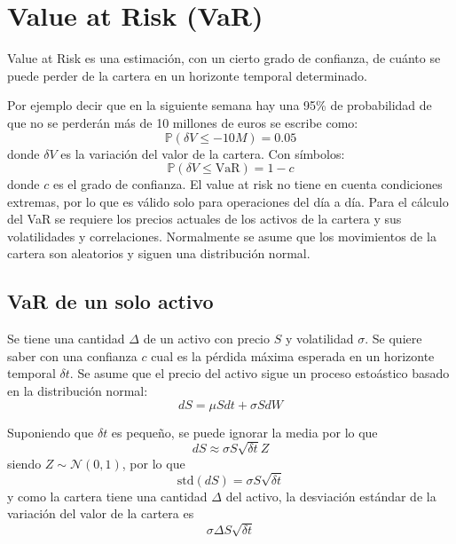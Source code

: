 \section{Value at Risk (VaR)}
Value at Risk es una estimación, con un cierto grado de confianza, de cuánto se puede perder de la cartera en un horizonte temporal determinado.

Por ejemplo decir que en la siguiente semana hay una 95\% de probabilidad de que no se perderán más de 10 millones de euros se escribe como:
\[
    \mathbb{P} \left( \delta V \leq -10M \right) = 0.05
\]
donde $\delta V$ es la variación del valor de la cartera. Con símbolos:
\[
    \mathbb{P} \left( \delta V \leq \text{VaR} \right) = 1 - c
\]
donde $c$ es el grado de confianza. El value at risk no tiene en cuenta condiciones extremas, por lo que es válido solo para operaciones del día a día. Para el cálculo del VaR se requiere los precios actuales de los activos de la cartera y sus volatilidades y correlaciones. Normalmente se asume que los movimientos de la cartera son aleatorios y siguen una distribución normal.



\subsection{VaR de un solo activo}
Se tiene una cantidad $\Delta$ de un activo con precio $S$ y volatilidad $\sigma$. Se quiere saber con una confianza $c$ cual es la pérdida máxima esperada en un horizonte temporal $\delta t$. Se asume que el precio del activo sigue un proceso estoástico basado en la distribución normal:
\[
    dS = \mu S dt + \sigma S dW
\]

Suponiendo que $\delta t$ es pequeño, se puede ignorar la media por lo que
\[
    dS \approx \sigma S \sqrt{\delta t} Z
\]
siendo $Z \sim \mathcal{N}(0,1)$, por lo que
\[
    \text{std}(dS) = \sigma S \sqrt{\delta t}
\]
y como la cartera tiene una cantidad $\Delta$ del activo, la desviación estándar de la variación del valor de la cartera es
\[
    \sigma \Delta S \sqrt{\delta t}
\]

